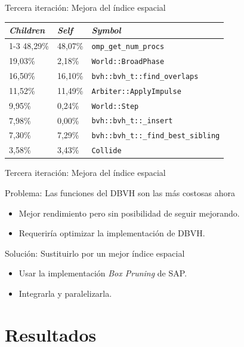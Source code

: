 \documentclass[10pt,xcolor=table]{beamer}
\begin{document}
\begin{frame}{Tercera iteración: Mejora del índice espacial}
\begin{table}[]
\begin{tabular}{lll}
\textbf{\textit{Children}} & \textbf{\textit{Self}} & \textbf{\textit{Symbol}} \\ \cline{1-3} 
48,29\% & 48,07\% & \texttt{omp\_get\_num\_procs} \\ \hline
19,03\% & 2,18\% & \texttt{World::BroadPhase} \\ \hline
\rowcolor{rojosuave}
16,50\% & 16,10\% & \texttt{bvh::bvh\_t::find\_overlaps} \\ \hline
11,52\% & 11,49\% & \texttt{Arbiter::ApplyImpulse} \\ \hline
9,95\% & 0,24\% & \texttt{World::Step} \\ \hline
\rowcolor{rojosuave}
7,98\% & 0,00\% & \texttt{bvh::bvh\_t::\_insert} \\ \hline
\rowcolor{rojosuave}
7,30\% & 7,29\% & \texttt{bvh::bvh\_t::\_find\_best\_sibling} \\ \hline
3,58\% & 3,43\% & \texttt{Collide} \\ \hline
\end{tabular}
\end{table}
\end{frame}

\begin{frame}{Tercera iteración: Mejora del índice espacial}
  \begin{block}{Problema: Las funciones del DBVH son las más costosas ahora}
  \begin{itemize}
    \item Mejor rendimiento pero sin posibilidad de seguir mejorando.
    \item Requeriría optimizar la implementación de DBVH.
    \end{itemize}
  \end{block}
  \begin{block}{Solución: Sustituirlo por un mejor índice espacial}
  \begin{itemize}
    \item Usar la implementación \textit{Box Pruning} de SAP.
    \item Integrarla y paralelizarla.
    \end{itemize}
  \end{block}
\end{frame}

\section{Resultados}
\end{document}

